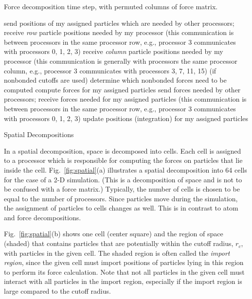 \begin{algorithm}
\caption{Force decomposition time step, with permuted columns of force matrix.}
\label{alg:force2}
\begin{algorithmic}[1]
\STATE send positions of my assigned particles which are needed by
other processors; receive {\em row} particle positions needed by my processor
(this communication is between processors in the same processor row, e.g., processor
3 communicates with processors 0, 1, 2, 3)
\STATE receive {\em column} particle positions needed by my processor
(this communication is generally with processors the same processor column, e.g.,
processor 3 communicates with processors 3, 7, 11, 15)
\STATE (if nonbonded cutoffs are used) determine which nonbonded forces need to be computed
\STATE compute forces for my assigned particles
\STATE send forces needed by other processors; receive forces needed for my
assigned particles (this communication is between processors in the same 
processor row, e.g., processor 3 communicates with processors 0, 1, 2, 3)
\STATE update positions (integration) for my assigned particles
\end{algorithmic}
\end{algorithm}

 {Spatial Decompositions}

In a spatial decomposition, space is decomposed into cells.
Each cell is assigned to a processor which is responsible
for computing the forces on particles that lie inside the cell.
Fig.~\ref{fig:spatial}(a) illustrates a spatial decomposition into 64 cells for the
case of a 2-D simulation.  (This is a decomposition of space and is
not to be confused with a force matrix.)  Typically, the number of cells
is chosen to be equal to the number of processors.
Since particles move during
the simulation, the assignment of particles to cells changes as well.
This is in contrast to atom and force decompositions.

Fig.~\ref{fig:spatial}(b) shows one cell (center square) and the region of space (shaded)
that contains particles that are potentially within the cutoff radius, $r_c$, with particles in 
the given cell.  The shaded region is often called the {\em import region}, since 
the given cell must import positions of particles lying in this region to 
perform its force calculation.  Note that 
not all particles in the given cell must interact with all particles in the import
region, especially if the import region is large compared to the cutoff radius.

